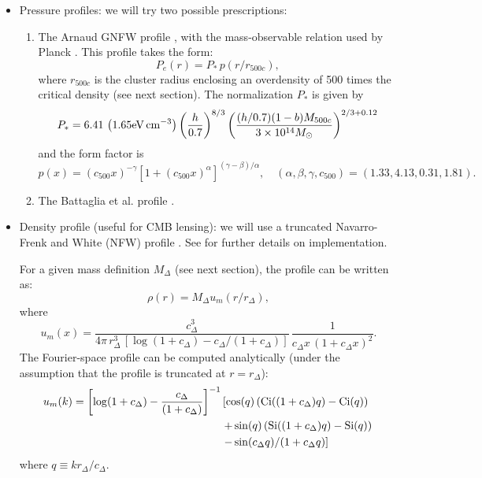 \documentclass{article}
\begin{document}
\begin{itemize}
\item Pressure profiles: we will try two possible prescriptions:
  \begin{enumerate}
  \item The Arnaud GNFW profile \cite{2010A&A...517A..92A}, with the mass-observable relation used by Planck \cite{2016A&A...594A..24P}. This profile takes the form:
    \begin{equation}
      P_e(r)=P_*\,p(r/r_{500c}),
    \end{equation}
    where $r_{500c}$ is the cluster radius enclosing an overdensity of 500 times the critical density (see next section). The normalization $P_*$ is given by
    \begin{equation}
      P_*=6.41\,\left(1.65 {\rm eV}\,{\rm cm}^{-3}\right)\left(\frac{h}{0.7}\right)^{8/3}\left(\frac{(h/0.7)(1-b)M_{500c}}{3\times10^{14}M_\odot}\right)^{2/3+0.12}
    \end{equation}
    and the form factor is
    \begin{equation}
      p(x)=(c_{500}x)^{-\gamma}\left[1+(c_{500}x)^\alpha\right]^{(\gamma-\beta)/\alpha},\hspace{12pt}(\alpha,\beta,\gamma,c_{500})=(1.33,4.13,0.31,1.81).
    \end{equation}

  \item The Battaglia et al. profile \cite{2012ApJ...758...75B}.
  \end{enumerate}
\item Density profile (useful for CMB lensing): we will use a truncated Navarro-Frenk and White (NFW) profile \cite{1997ApJ...490..493N}. See \cite{2017MNRAS.470.2100K} for further details on implementation.

  For a given mass definition $M_\Delta$ (see next section), the profile can be written as:
  \begin{equation}
    \rho(r)=M_\Delta u_m(r/r_\Delta),
  \end{equation}
  where
  \begin{equation}
    u_m(x)=\frac{c_\Delta^3}{4\pi\,r_\Delta^3\,[\log(1+c_\Delta)-c_\Delta/(1+c_\Delta)]}\,\frac{1}{c_\Delta x\,(1+c_\Delta x)^2}.
  \end{equation}
  The Fourier-space profile can be computed analytically (under the assumption that the profile is truncated at $r=r_\Delta$):
  \begin{align}\nonumber
    u_m(k)=\left[\log(1+c_\Delta)-\frac{c_\Delta}{(1+c_\Delta)}\right]^{-1}&\left[\cos(q)\left({\rm Ci}((1+c_\Delta)q)-{\rm Ci}(q)\right)\right.\\\nonumber
      &\left.+\sin(q)\left({\rm Si}((1+c_\Delta)q)-{\rm Si}(q)\right)\right.\\&\left.-\sin(c_\Delta q)/(1+c_\Delta q)\right]
  \end{align}
  where $q\equiv kr_\Delta/c_\Delta$.


\end{itemize}
\end{document}

